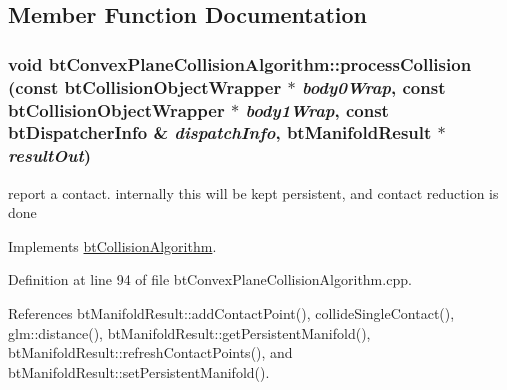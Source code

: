 \subsection{Member Function Documentation}
\hypertarget{classbt_convex_plane_collision_algorithm_ce95b966a346d00f7666549220f6afb8}{
\subsubsection[processCollision]{\setlength{\rightskip}{0pt plus 5cm}void btConvexPlaneCollisionAlgorithm::processCollision (const btCollisionObjectWrapper $\ast$ {\em body0Wrap}, \/  const btCollisionObjectWrapper $\ast$ {\em body1Wrap}, \/  const btDispatcherInfo \& {\em dispatchInfo}, \/  {\bf btManifoldResult} $\ast$ {\em resultOut})}}
\label{classbt_convex_plane_collision_algorithm_ce95b966a346d00f7666549220f6afb8}




report a contact. internally this will be kept persistent, and contact reduction is done 

Implements \hyperlink{classbt_collision_algorithm}{btCollisionAlgorithm}.

Definition at line 94 of file btConvexPlaneCollisionAlgorithm.cpp.

References btManifoldResult::addContactPoint(), collideSingleContact(), glm::distance(), btManifoldResult::getPersistentManifold(), btManifoldResult::refreshContactPoints(), and btManifoldResult::setPersistentManifold().

